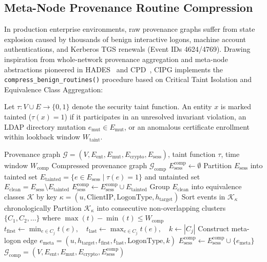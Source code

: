 \subsection{Meta-Node Provenance Routine Compression}
\label{sec:provenance_compression}
In production enterprise environments, raw provenance graphs suffer from state explosion caused by thousands of benign interactive logons, machine account authentications, and Kerberos TGS renewals (Event IDs 4624/4769). Drawing inspiration from whole-network provenance aggregation and meta-node abstractions pioneered in HADES~\cite{liu2026hades} and CPD~\cite{liu2026cpd}, CIPG implements the \texttt{compress\_benign\_routines()} procedure based on Critical Taint Isolation and Equivalence Class Aggregation:

\begin{definition}
Let $\tau: V \cup E \to \{0, 1\}$ denote the security taint function. An entity $x$ is marked tainted ($\tau(x) = 1$) if it participates in an unresolved invariant violation, an LDAP directory mutation $e_{\text{mut}} \in E_{\text{mut}}$, or an anomalous certificate enrollment within lookback window $W_{\text{taint}}$.
\end{definition}

\begin{algorithm}[H]
\caption{Meta-Node Routine Provenance Compression (\texttt{compress\_benign\_routines})}
\label{alg:provenance_compression}
\begin{algorithmic}[1]
\Require Provenance graph $\mathcal{G} = (V, E_{\text{ent}}, E_{\text{mut}}, E_{\text{crypto}}, E_{\text{sess}})$, taint function $\tau$, time window $W_{\text{comp}}$
\Ensure Compressed provenance graph $\mathcal{G}_{\text{comp}}$
\State $E_{\text{sess}}^{\text{comp}} \gets \emptyset$
\State Partition $E_{\text{sess}}$ into tainted set $E_{\text{tainted}} = \{e \in E_{\text{sess}} \mid \tau(e) = 1\}$ and untainted set $E_{\text{clean}} = E_{\text{sess}} \setminus E_{\text{tainted}}$
\State $E_{\text{sess}}^{\text{comp}} \gets E_{\text{sess}}^{\text{comp}} \cup E_{\text{tainted}}$ 
\State Group $E_{\text{clean}}$ into equivalence classes $\mathcal{K}$ by key $\kappa = (u, \text{ClientIP}, \text{LogonType}, h_{\text{target}})$
    \State Sort events in $\mathcal{K}_{\kappa}$ chronologically
    \State Partition $\mathcal{K}_{\kappa}$ into consecutive non-overlapping clusters $\{C_1, C_2, \dots\}$ where $\max(t) - \min(t) \le W_{\text{comp}}$
        \State $t_{\text{first}} \gets \min_{e \in C_j} t(e), \quad t_{\text{last}} \gets \max_{e \in C_j} t(e), \quad k \gets |C_j|$
        \State Construct meta-logon edge $e_{\text{meta}} = (u, h_{\text{target}}, t_{\text{first}}, t_{\text{last}}, \text{LogonType}, k)$
        \State $E_{\text{sess}}^{\text{comp}} \gets E_{\text{sess}}^{\text{comp}} \cup \{e_{\text{meta}}\}$
    \EndFor
\EndFor
\State \Return $\mathcal{G}_{\text{comp}} = (V, E_{\text{ent}}, E_{\text{mut}}, E_{\text{crypto}}, E_{\text{sess}}^{\text{comp}})$
\end{algorithmic}
\end{algorithm}


